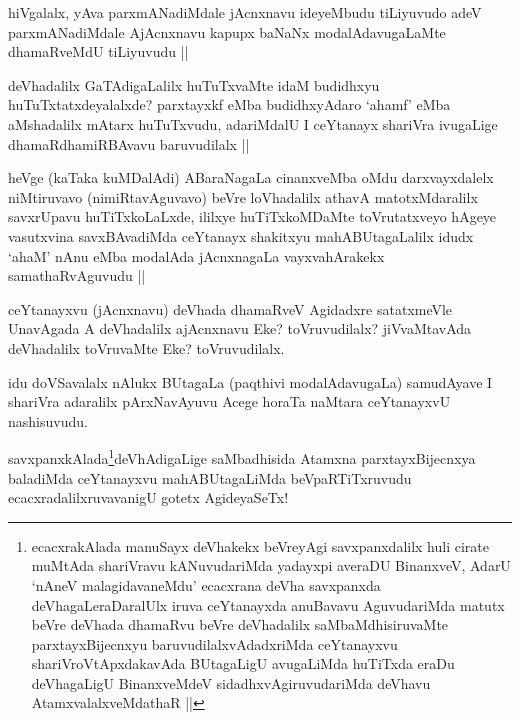 \begin{artha}
hiVgalalx, yAva parxmANadiMdale jAcnxnavu ideyeMbudu tiLiyuvudo adeV parxmANadiMdale AjAcnxnavu kapupx baNaNx modalAdavugaLaMte dhamaRveMdU tiLiyuvudu ||
\end{artha}

\begin{artha}
deVhadalilx GaTAdigaLalilx huTuTxvaMte idaM budidhxyu huTuTxtatxdeyalalxde? parxtayxkf eMba budidhxyAdaro `ahamf' eMba aMshadalilx mAtarx huTuTxvudu, adariMdalU I ceYtanayx shariVra ivugaLige dhamaRdhamiRBAvavu baruvudilalx ||
\end{artha}

\begin{artha}
heVge (kaTaka kuMDalAdi) ABaraNagaLa cinanxveMba oMdu darxvayxdalelx niMtiruvavo (nimiRtavAguvavo) beVre loVhadalilx athavA matotxMdaralilx savxrUpavu huTiTxkoLaLxde, ililxye huTiTxkoMDaMte toVrutatxveyo hAgeye vasutxvina savxBAvadiMda ceYtanayx shakitxyu mahABUtagaLalilx idudx `ahaM' nAnu eMba modalAda jAcnxnagaLa vayxvahArakekx samathaRvAguvudu ||
\end{artha}

\begin{artha}
ceYtanayxvu (jAcnxnavu) deVhada dhamaRveV Agidadxre satatxmeVle UnavAgada A deVhadalilx ajAcnxnavu Eke? toVruvudilalx? jiVvaMtavAda deVhadalilx toVruvaMte Eke? toVruvudilalx.
\end{artha}

\begin{artha}
idu doVSavalalx nAlukx BUtagaLa (paqthivi modalAdavugaLa) samudAyave I shariVra adaralilx pArxNavAyuvu Acege horaTa naMtara ceYtanayxvU nashisuvudu. 
\end{artha}

\begin{artha}
savxpanxkAlada\footnote{ecacxrakAlada manuSayx deVhakekx beVreyAgi savxpanxdalilx huli cirate muMtAda shariVravu kANuvudariMda yadayxpi  averaDU BinanxveV, AdarU `nAneV malagidavaneMdu' ecacxrana deVha savxpanxda deVhagaLeraDaralUlx iruva ceYtanayxda anuBavavu AguvudariMda matutx beVre deVhada dhamaRvu beVre deVhadalilx saMbaMdhisiruvaMte parxtayxBijecnxyu baruvudilalxvAdadxriMda ceYtanayxvu shariVroVtApxdakavAda BUtagaLigU avugaLiMda huTiTxda eraDu deVhagaLigU BinanxveMdeV sidadhxvAgiruvudariMda deVhavu AtamxvalalxveMdathaR ||}deVhAdigaLige saMbadhisida Atamxna parxtayxBijecnxya baladiMda ceYtanayxvu mahABUtagaLiMda beVpaRTiTxruvudu ecacxradalilxruvavanigU gotetx AgideyaSeTx!
\end{artha}

